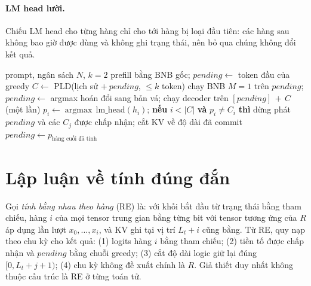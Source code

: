 \documentclass[a4paper,11pt]{article}
\begin{document}
\paragraph{LM head lười.} Chiếu LM head cho từng hàng chỉ cho tới hàng bị loại đầu tiên: các hàng sau không bao giờ được dùng và không ghi trạng thái, nên bỏ qua chúng không đổi kết quả.

\begin{algorithm}[t]
\caption{Một lượt sinh của B2 (rút gọn)}\label{alg:b2}
\begin{algorithmic}[1]
\Require prompt, ngân sách $N$, $k{=}2$
\State prefill bằng BNB gốc; $\mathit{pending}\gets$ token đầu của greedy
  \State $C\gets$ PLD(lịch sử $+\ \mathit{pending}$, $\le k$ token)
    \State chạy BNB $M{=}1$ trên $\mathit{pending}$; $\mathit{pending}\gets$ argmax
  \Else
    \State hoán đổi sang bản vá; chạy decoder trên $[\mathit{pending}]\,{+}\,C$ (một lần)
     
      \State $p_i\gets \operatorname{argmax}\,\mathrm{lm\_head}(h_i)$; \textbf{nếu} $i<|C|$ \textbf{và} $p_i\neq C_i$ \textbf{thì} dừng
    \EndFor
    \State phát $\mathit{pending}$ và các $C_j$ được chấp nhận; cắt KV về độ dài đã commit
    \State $\mathit{pending}\gets p_{\text{hàng cuối đã tính}}$
  \EndIf
\EndWhile
\end{algorithmic}
\end{algorithm}

\section{Lập luận về tính đúng đắn}\label{sec:argument}
Gọi \emph{tính bằng nhau theo hàng} (RE) là: với khối bắt đầu từ trạng thái bằng tham chiếu, hàng $i$ của mọi tensor trung gian bằng từng bit với tensor tương ứng của $R$ áp dụng lần lượt $x_0,\dots,x_i$, và KV ghi tại vị trí $L_t{+}i$ cũng bằng. Từ RE, quy nạp theo chu kỳ cho kết quả: (1) logits hàng $i$ bằng tham chiếu; (2) tiền tố được chấp nhận và $\mathit{pending}$ bằng chuỗi greedy; (3) cắt độ dài logic giữ lại đúng $[0,L_t{+}j{+}1)$; (4) chu kỳ không đề xuất chính là $R$. Giả thiết duy nhất không thuộc cấu trúc là RE ở từng toán tử.
\end{document}
